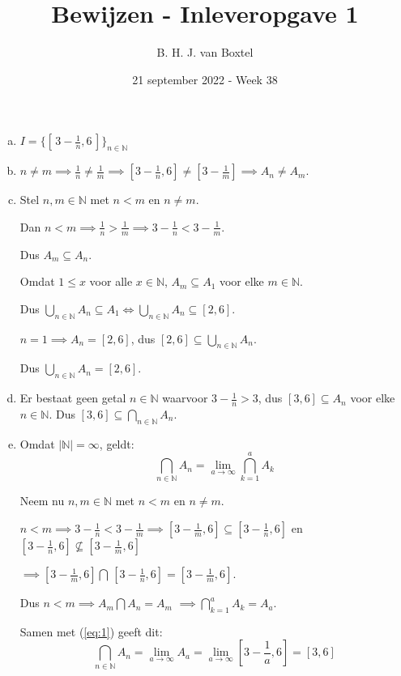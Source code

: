 \documentclass[12pt, a4paper]{article}
\begin{document}
\title{Bewijzen - Inleveropgave 1}
\author{B. H. J. van Boxtel}
\date{21 september 2022 - Week 38} 

\maketitle
{} %

\begin{enumerate}[(a).] 
    \item $I = \{[\, 3 - \frac{1}{n}, 6 \,]\}_{n \in \mathbb{N}}$
    \bigskip
    \item $n \neq m \implies \frac{1}{n} \neq \frac{1}{m} \implies [3 -\frac{1}{n}, 6] \neq [3 - \frac{1}{m}] \implies A_n \neq A_m$.
    \bigskip
    \item Stel $n,m \in \mathbb{N}$ met $n < m$ en $n \neq m$.
    
    Dan $n < m \implies \frac{1}{n} > \frac{1}{m} \implies 3 - \frac{1}{n} < 3 - \frac{1}{m}$.

    Dus $A_m \subseteq A_n$.

    Omdat $1 \leq x$ voor alle $x \in \mathbb{N}$, $ A_m \subseteq A_1$ voor elke $m \in \mathbb{N}$.

    Dus $\bigcup_{n \in \mathbb{N}} A_n \subseteq A_1 \iff \bigcup_{n \in \mathbb{N}} A_n \subseteq [2,6]$.
    \bigskip

    $n = 1 \implies A_n = [2,6]$, dus $[2,6] \subseteq \bigcup_{n \in \mathbb{N}} A_n$.

    Dus $\bigcup_{n \in \mathbb{N}} A_n = [2,6]$.
    \bigskip

    \item Er bestaat geen getal $n \in \mathbb{N}$ waarvoor $3 - \frac{1}{n} > 3$, dus $[3,6] \subseteq A_n$ voor elke $n \in \mathbb{N}$. Dus $[3,6] \subseteq \bigcap_{n \in \mathbb{N}} A_n$.
    \bigskip

    \item Omdat $\lvert \mathbb{N} \rvert = \infty$, geldt:
    \begin{equation} \label{eq:1}
        \bigcap_{n \in \mathbb{N}} A_n = \lim_{a\to\infty}\bigcap_{k = 1}^{a} A_k
    \end{equation}

    Neem nu $n,m \in \mathbb{N}$ met $n < m$ en $n \neq m$.

    $n < m \implies 3 - \frac{1}{n} < 3 - \frac{1}{m} \implies [3 - \frac{1}{m}, 6] \subseteq [3 - \frac{1}{n}, 6]$ en $[3 - \frac{1}{n}, 6] \nsubseteq [3 - \frac{1}{m}, 6]$
    
    $\implies [3 - \frac{1}{m}, 6] \bigcap \, [3 - \frac{1}{n}, 6] = [3 - \frac{1}{m}, 6].$ 
    
    Dus $n < m \implies A_m \bigcap A_n = A_m$ $\implies \bigcap_{k = 1}^{a} A_k = A_a$.
    \bigskip

    Samen met (\ref{eq:1}) geeft dit:
    \begin{equation}
        \bigcap_{n \in \mathbb{N}} A_n = \lim_{a\to\infty}A_a = \lim_{a\to\infty} [3 - \frac{1}{a}, 6] = [3 , 6]
    \end{equation}

\end{enumerate}
\end{document}
